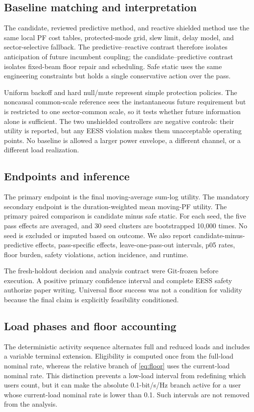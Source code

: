 \documentclass[journal]{IEEEtran}
\begin{document}
\subsection{Baseline matching and interpretation}
The candidate, reviewed predictive method, and reactive shielded method use the same local PF cost tables, protected-mode grid, slew limit, delay model, and sector-selective fallback. The predictive--reactive contrast therefore isolates anticipation of future incumbent coupling; the candidate--predictive contrast isolates fixed-beam floor repair and scheduling. Safe static uses the same engineering constraints but holds a single conservative action over the pass.

Uniform backoff and hard null/mute represent simple protection policies. The noncausal common-scale reference sees the instantaneous future requirement but is restricted to one sector-common scale, so it tests whether future information alone is sufficient. The two unshielded controllers are negative controls: their utility is reported, but any EESS violation makes them unacceptable operating points. No baseline is allowed a larger power envelope, a different channel, or a different load realization.

\subsection{Endpoints and inference}
The primary endpoint is the final moving-average sum-log utility. The mandatory secondary endpoint is the duration-weighted mean moving-PF utility. The primary paired comparison is candidate minus safe static. For each seed, the five pass effects are averaged, and 30 seed clusters are bootstrapped 10,000 times. No seed is excluded or imputed based on outcome. We also report candidate-minus-predictive effects, pass-specific effects, leave-one-pass-out intervals, p05 rates, floor burden, safety violations, action incidence, and runtime.

The fresh-holdout decision and analysis contract were Git-frozen before execution. A positive primary confidence interval and complete EESS safety authorize paper writing. Universal floor success was not a condition for validity because the final claim is explicitly feasibility conditioned.


\subsection{Load phases and floor accounting}
The deterministic activity sequence alternates full and reduced loads and includes a variable terminal extension. Eligibility is computed once from the full-load nominal rate, whereas the relative branch of \eqref{eq:floor} uses the current-load nominal rate. This distinction prevents a low-load interval from redefining which users count, but it can make the absolute 0.1-bit/s/Hz branch active for a user whose current-load nominal rate is lower than 0.1. Such intervals are not removed from the analysis.
\end{document}
